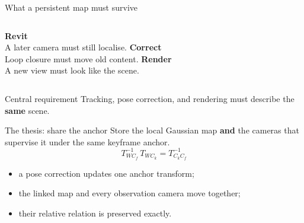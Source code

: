 \documentclass[aspectratio=169,11pt]{beamer}
\begin{document}
\begin{frame}{What a persistent map must survive}
  \vspace{2pt}
  \begin{columns}[t]
    \centering\color{sblue}\large\textbf{Revit}\\[3pt]
    \color{black}\small A later camera must still localise.
    \centering\color{amber}\large\textbf{Correct}\\[3pt]
    \color{black}\small Loop closure must move old content.
    \centering\color{teal}\large\textbf{Render}\\[3pt]
    \color{black}\small A new view must look like the scene.
  \end{columns}
  \vspace{10pt}
  \begin{block}{Central requirement}
    Tracking, pose correction, and rendering must describe the \textbf{same} scene.
  \end{block}
\end{frame}

\begin{frame}{The thesis: share the anchor}
  \large
  Store the local Gaussian map \textbf{and} the cameras that supervise it under the \alert{same keyframe anchor}.
  \normalsize
  \vspace{8pt}
  \begin{equation*}
    T_{WC_f}^{-1}\,T_{WC_k} = T_{C_k C_f}^{-1}
  \end{equation*}
  \vspace{2pt}
  \begin{itemize}
    \item a pose correction updates one anchor transform;
    \item the linked map and every observation camera move together;
    \item their relative relation is preserved exactly.
  \end{itemize}
\end{frame}
\end{document}
